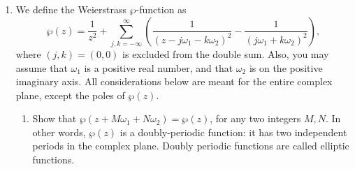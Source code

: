 \documentclass[10pt]{amsart}
\theoremstyle{nonumberplain}
\begin{document}
\begin{enumerate}[label={\bf {\arabic*}:}]
\item We define the Weierstrass $\wp$-function as
$$
\wp(z)=\frac{1}{z^2}+\sum_{j, k=-\infty}^{\infty}\left(\frac{1}{\left(z-j \omega_1-k \omega_2\right)^2}-\frac{1}{\left(j \omega_1+k \omega_2\right)^2}\right),
$$
where $(j, k)=(0,0)$ is excluded from the double sum. Also, you may
assume that $\omega_1$ is a positive real number, and that $\omega_2$
is on the positive imaginary axis. All considerations below are meant
for the entire complex plane, except the poles of $\wp(z)$.
\begin{enumerate}
\item Show that $\wp\left(z+M \omega_1+N \omega_2\right)=\wp(z)$, for any two integers $M, N$. In other words, $\wp(z)$ is a doubly-periodic function: it has two independent periods in the complex plane. Doubly periodic functions are called elliptic functions. \\


\end{enumerate}
\end{enumerate}
\end{document}
